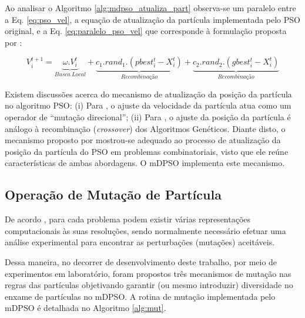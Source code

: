 \documentclass[
	12pt,				%
	openany,			%
	oneside,	
	a4paper,			%
	brazil,				%
	]{unimontes-ppgmsc-abntex2}
\begin{document}
Ao analisar o Algoritmo \ref{alg:mdpso_atualiza_part} observa-se um paralelo entre a Eq. \ref{eq:pso_vel}, a equação de atualização da partícula implementada pelo PSO original, e a Eq. \ref{eq:paralelo_pso_vel} que corresponde à formulação proposta por :

\begin{equation}
\label{eq:paralelo_pso_vel}
V^{t+1}_{i} = \underbrace{\omega . V^{t}_{i}}_{Busca\ Local} + \underbrace{c_1 . rand_1 . (pbest^{t}_{i} - X^{t}_{i})}_{Recombinação} + \underbrace{c_2 . rand_2 . (gbest^{t}_{i} - X^{t}_{i})}_{Recombinação}
\end{equation}

Existem discussões acerca do mecanismo de atualização da posição da partícula no algoritmo PSO: (i) Para , o ajuste da velocidade da partícula atua como um operador de ``mutação direcional''; (ii) Para , o ajuste da posição da partícula é análogo à recombinação ({\em crossover}) dos Algoritmos Genéticos. Diante disto, o mecanismo proposto por  mostrou-se adequado ao processo de atualização da posição da partícula do PSO em problemas combinatoriais, visto que ele reúne características de ambas abordagens. O mDPSO implementa este mecanismo.

\subsection{Operação de Mutação de Partícula}
\label{sec:mdpso_mutacao}

De acordo , para cada problema podem existir várias representações computacionais às suas resoluções, sendo normalmente necessário efetuar uma análise experimental para encontrar as perturbações (mutações) aceitáveis. 

Dessa maneira, no decorrer de desenvolvimento deste trabalho, por meio de experimentos em laboratório, foram propostos três mecanismos de mutação nas regras das partículas objetivando garantir (ou mesmo introduzir) diversidade no enxame de partículas no mDPSO. A rotina de mutação implementada pelo mDPSO é detalhada no Algoritmo \ref{alg:mut}.
\end{document}
